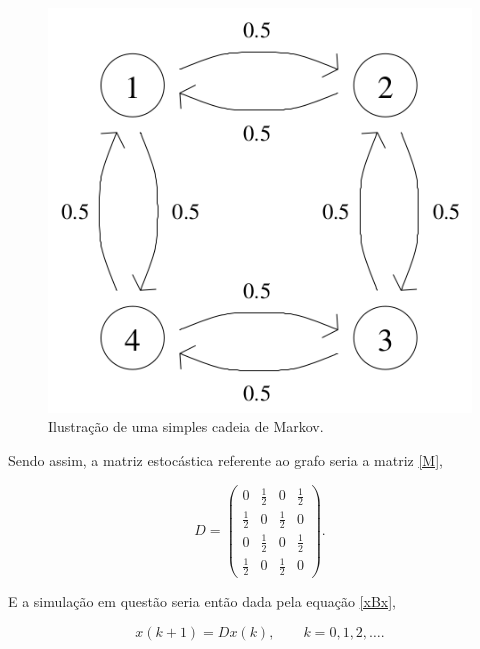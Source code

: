 \
\begin{figure}[!htb]
	\centering
	\includegraphics[scale=0.3]{imagens/markovchain}
	\caption{Ilustração de uma simples cadeia de Markov.}
	\label{markovchain}
\end{figure}

\noindent Sendo assim, a matriz estocástica referente ao grafo seria a matriz \eqref{M},

\begin{equation}\label{M}
	D = \begin{pmatrix}
 			0		&	\frac{1}{2}	&	0			&	\frac{1}{2}\\
 		\frac{1}{2}	&	0			&	\frac{1}{2}	&	0\\
 			0		&	\frac{1}{2}	&	0			& 	\frac{1}{2}\\
 		\frac{1}{2}	&	0			&	\frac{1}{2}	&	0
		\end{pmatrix}.
\end{equation} 

\noindent E a simulação em questão seria então dada pela equação \eqref{xBx},

\begin{equation} \label{xBx}
	x(k+1) = D x(k),\qquad k=0,1,2,\ldots.
\end{equation}